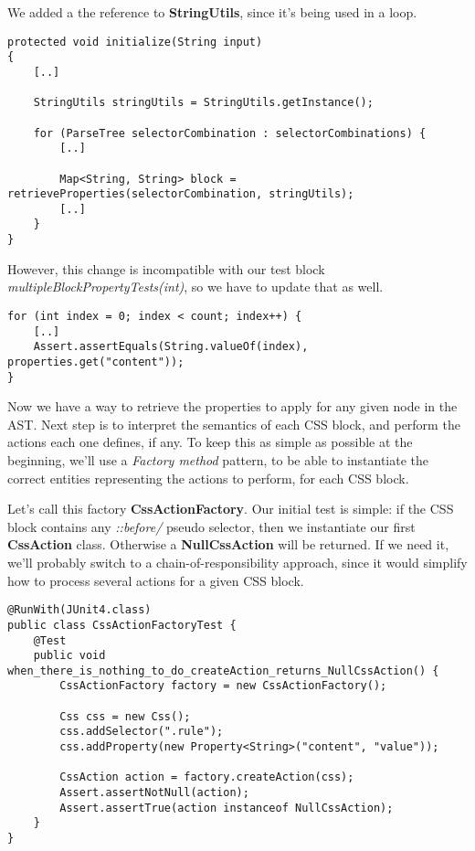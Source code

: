 \documentclass[11pt]{article}
\begin{document}
We added a the reference to \textbf{StringUtils}, since it's being used in a loop.

\begin{verbatim}
protected void initialize(String input)
{
    [..]

    StringUtils stringUtils = StringUtils.getInstance();

    for (ParseTree selectorCombination : selectorCombinations) {
        [..]

        Map<String, String> block = retrieveProperties(selectorCombination, stringUtils);
        [..]
    }
}
\end{verbatim}

However, this change is incompatible with our test block \emph{multipleBlockPropertyTests(int)}, so
we have to update that as well.

\begin{verbatim}
for (int index = 0; index < count; index++) {
    [..]
    Assert.assertEquals(String.valueOf(index), properties.get("content"));
}
\end{verbatim}

Now we have a way to retrieve the properties to apply for any given node in the AST.
Next step is to interpret the semantics of each CSS block, and perform the actions each one defines, if any.
To keep this as simple as possible at the beginning, we'll use a \emph{Factory method} pattern, to
be able to instantiate the correct entities representing the actions to perform, for each CSS block.

Let's call this factory \textbf{CssActionFactory}. Our initial test is simple: if the CSS block contains
any \emph{::before/} pseudo selector, then we instantiate our first \textbf{CssAction} class. Otherwise a \textbf{NullCssAction}
will be returned. If we need it, we'll probably switch to a chain-of-responsibility approach, since it
would simplify how to process several actions for a given CSS block.

\begin{verbatim}
@RunWith(JUnit4.class)
public class CssActionFactoryTest {
    @Test
    public void when_there_is_nothing_to_do_createAction_returns_NullCssAction() {
        CssActionFactory factory = new CssActionFactory();

        Css css = new Css();
        css.addSelector(".rule");
        css.addProperty(new Property<String>("content", "value"));

        CssAction action = factory.createAction(css);
        Assert.assertNotNull(action);
        Assert.assertTrue(action instanceof NullCssAction);
    }
}
\end{verbatim}
\end{document}

